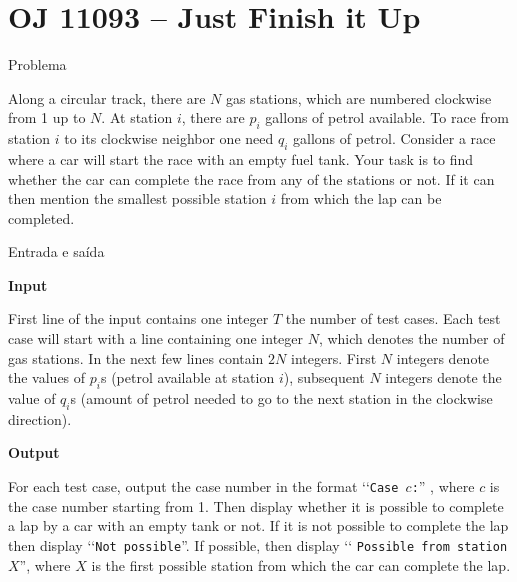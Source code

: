 \section{OJ 11093 -- Just Finish it Up}

\begin{frame}[fragile]{Problema}

Along a circular track, there are $N$ gas stations, which are numbered clockwise from 1 up to $N$. 
At station $i$, there are $p_i$ gallons of petrol available. To race from station $i$ to its 
clockwise neighbor one need $q_i$ gallons of petrol. Consider a race where a car will start the 
race with an empty fuel tank. Your task is to find whether the car can complete the race from any 
of the stations or not. If it can then mention the smallest possible station $i$ from which the 
lap can be completed.

\end{frame}
 
\begin{frame}[fragile]{Entrada e saída}

\textbf{Input}

First line of the input contains one integer $T$ the number of test cases. Each test case will 
start with a line containing one integer $N$, which denotes the number of gas stations. In the 
next few lines contain $2N$ integers. First $N$ integers denote the values of $p_i$s 
(petrol available at station $i$), subsequent $N$ integers denote the value of $q_i$s 
(amount of petrol needed to go to the next station in the clockwise direction).

\textbf{Output}

For each test case, output the case number in the format \lq\lq \texttt{Case $c$:}” , 
where $c$ is the case number starting from 1. Then display whether it is possible to complete a 
lap by a car with an empty tank or not. If it is not possible to complete the lap then display 
\lq\lq \texttt{Not possible}”. If possible, then display \lq\lq 
\texttt{Possible from station $X$}”, where $X$ is the first possible station from which the car 
can complete the lap.

\end{frame}


